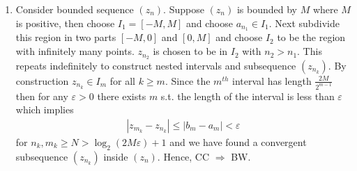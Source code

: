 \begin{enumerate}[label=(\alph*)]
    \item 
    Consider bounded sequence $(z_n)$. Suppose $(z_n)$ is bounded by $M$ where $M$ is 
    positive, then choose
    $I_1 = [-M,M]$ and choose $a_{n_1} \in I_1$. Next subdivide this region in two parts $[-M,0]$
    and $[0,M]$ and choose $I_2$ to be the region with infinitely many points. $z_{n_2}$ is chosen
    to be in $I_2$ with $n_2 > n_1$. This repeats indefinitely to construct nested intervals and 
    subsequence $(z_{n_k})$. By construction $z_{n_k} \in I_m$ for all $ k \geq m$.
    Since the $m^{th}$ interval has length $\frac{2M}{2^{m-1}}$ then for any $\varepsilon > 0$
    there exists $m$ s.t. the length of the interval is less than $\varepsilon$ which implies
    \begin{align*}
        |z_{m_k} - z_{n_k}| \leq |b_m - a_m| < \varepsilon 
    \end{align*}
    for $n_k,m_k \geq N > \log_2(2M\varepsilon) + 1$ and we have found a convergent subsequence
    $(z_{n_k})$ inside $(z_n)$.
    Hence, CC $\Rightarrow$ BW.

 \end{enumerate}